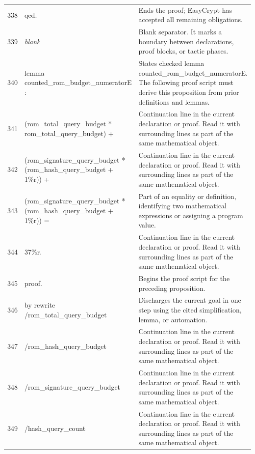 \documentclass[10pt]{article}
\begin{document}
\begin{longtable}{r L{0.53\textwidth} L{0.37\textwidth}}
338 & {\ttfamily\scriptsize qed.} & Ends the proof; EasyCrypt has accepted all remaining obligations. \\
339 & {\ttfamily\scriptsize \emph{blank}} & Blank separator.  It marks a boundary between declarations, proof blocks, or tactic phases. \\
340 & {\ttfamily\scriptsize lemma counted\_rom\_budget\_numeratorE :} & States checked lemma counted\_rom\_budget\_numeratorE.  The following proof script must derive this proposition from prior definitions and lemmas. \\
341 & {\ttfamily\scriptsize   (rom\_total\_query\_budget * rom\_total\_query\_budget) +} & Continuation line in the current declaration or proof.  Read it with surrounding lines as part of the same mathematical object. \\
342 & {\ttfamily\scriptsize   (rom\_signature\_query\_budget * (rom\_hash\_query\_budget + 1\%r)) +} & Continuation line in the current declaration or proof.  Read it with surrounding lines as part of the same mathematical object. \\
343 & {\ttfamily\scriptsize   (rom\_signature\_query\_budget * (rom\_hash\_query\_budget + 1\%r)) =} & Part of an equality or definition, identifying two mathematical expressions or assigning a program value. \\
344 & {\ttfamily\scriptsize   37\%r.} & Continuation line in the current declaration or proof.  Read it with surrounding lines as part of the same mathematical object. \\
345 & {\ttfamily\scriptsize proof.} & Begins the proof script for the preceding proposition. \\
346 & {\ttfamily\scriptsize by rewrite /rom\_total\_query\_budget} & Discharges the current goal in one step using the cited simplification, lemma, or automation. \\
347 & {\ttfamily\scriptsize            /rom\_hash\_query\_budget} & Continuation line in the current declaration or proof.  Read it with surrounding lines as part of the same mathematical object. \\
348 & {\ttfamily\scriptsize            /rom\_signature\_query\_budget} & Continuation line in the current declaration or proof.  Read it with surrounding lines as part of the same mathematical object. \\
349 & {\ttfamily\scriptsize            /hash\_query\_count} & Continuation line in the current declaration or proof.  Read it with surrounding lines as part of the same mathematical object. \\

\end{longtable}
\end{document}

